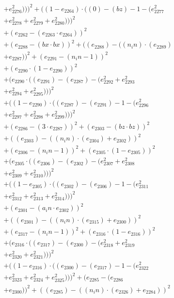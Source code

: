 \documentclass[10pt, a4paper]{article}
\begin{document}
\begin{align*}
& + e_{2276}^{2})))^{2} + ((1 - e_{2264})  \cdot  ((0) - (bz) - 1 - (e_{2277}^{2} \\
& + e_{2278}^{2} + e_{2279}^{2} + e_{2280}^{2})))^{2} \\
& + (e_{2262} - (e_{2263}  \cdot  e_{2264}))^{2} \\
& + (e_{2288} - (bx  \cdot  bx))^{2} + ((e_{2288}) - ((n_in)  \cdot  (e_{2289}) \\
& + e_{2287}))^{2} + (e_{2291} - (n_in - 1))^{2} \\
& + (e_{2290}  \cdot  (1 - e_{2290}))^{2} \\
& + (e_{2290}  \cdot  ((e_{2291}) - (e_{2287}) - (e_{2292}^{2} + e_{2293}^{2} \\
& + e_{2294}^{2} + e_{2295}^{2})))^{2} \\
& + ((1 - e_{2290})  \cdot  ((e_{2287}) - (e_{2291}) - 1 - (e_{2296}^{2} \\
& + e_{2297}^{2} + e_{2298}^{2} + e_{2299}^{2})))^{2} \\
& + (e_{2286} - (3  \cdot  e_{2287}))^{2} + (e_{2303} - (bz  \cdot  bz))^{2} \\
& + ((e_{2303}) - ((n_in)  \cdot  (e_{2304}) + e_{2302}))^{2} \\
& + (e_{2306} - (n_in - 1))^{2} + (e_{2305}  \cdot  (1 - e_{2305}))^{2} \\
& + (e_{2305}  \cdot  ((e_{2306}) - (e_{2302}) - (e_{2307}^{2} + e_{2308}^{2} \\
& + e_{2309}^{2} + e_{2310}^{2})))^{2} \\
& + ((1 - e_{2305})  \cdot  ((e_{2302}) - (e_{2306}) - 1 - (e_{2311}^{2} \\
& + e_{2312}^{2} + e_{2313}^{2} + e_{2314}^{2})))^{2} \\
& + (e_{2301} - (a_in  \cdot  e_{2302}))^{2} \\
& + ((e_{2301}) - ((n_in)  \cdot  (e_{2315}) + e_{2300}))^{2} \\
& + (e_{2317} - (n_in - 1))^{2} + (e_{2316}  \cdot  (1 - e_{2316}))^{2} \\
& + (e_{2316}  \cdot  ((e_{2317}) - (e_{2300}) - (e_{2318}^{2} + e_{2319}^{2} \\
& + e_{2320}^{2} + e_{2321}^{2})))^{2} \\
& + ((1 - e_{2316})  \cdot  ((e_{2300}) - (e_{2317}) - 1 - (e_{2322}^{2} \\
& + e_{2323}^{2} + e_{2324}^{2} + e_{2325}^{2})))^{2} + (e_{2285} - (e_{2286} \\
& + e_{2300}))^{2} + ((e_{2285}) - ((n_in)  \cdot  (e_{2326}) + e_{2284}))^{2} \\

\end{align*}
\end{document}
